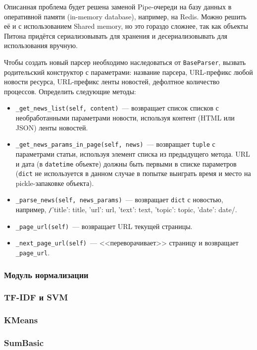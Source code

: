 \documentclass[a4paper, 14pt]{extarticle}
\begin{document}
Описанная проблема будет решена заменой Pipe-очереди на базу данных в оперативной памяти (in-memory database), например, на Redis. Можно решить её и с использованием Shared memory, но это гораздо сложнее, так как объекты Питона придётся сериализовывать для хранения и десериализовывать для использования вручную.

Чтобы создать новый парсер необходимо наследоваться от \texttt{BaseParser}, вызвать родительский конструктор с параметрами: название парсера, URL-префикс любой новости ресурса, URL-префикс ленты новостей, дефолтное количество процессов. Определить следующие методы:
\begin{itemize}
	\item \texttt{\_get\_news\_list(self, content)}~--- возвращает список списков с необработанными параметрами новости, используя контент (HTML или JSON) ленты новостей.
	\item \texttt{\_get\_news\_params\_in\_page(self, news)}~--- возвращает \texttt{tuple} с параметрами статьи, используя элемент списка из предыдущего метода. URL и дата (в \texttt{datetime} объекте) должны быть первыми в списке параметров (\texttt{dict} не используется в данном случае в попытке выиграть время и место на pickle-запаковке объекта).
	\item \texttt{\_parse\_news(self, news\_params)}~--- возвращает \texttt{dict} с новостью, например, \texttt/{'title': title, 'url': url, 'text': text, 'topic': topic, 'date': date}/.
	\item \texttt{\_page\_url(self)}~--- возвращает URL текущей страницы.
	\item \texttt{\_next\_page\_url(self)}~--- <<переворачивает>> страницу и возвращает \texttt{\_page\_url}.
\end{itemize}



\subsubsection{Модуль нормализации}
\subsubsection{TF-IDF и SVM}
\subsubsection{KMeans}
\subsubsection{SumBasic}
\end{document}
